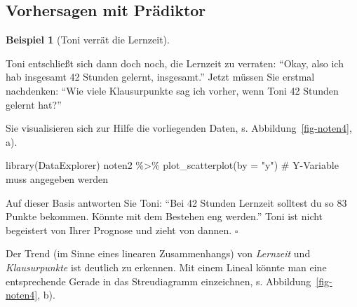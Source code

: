 \documentclass[
  letterpaper,
]{scrbook}
\newenvironment{Shaded}{\begin{snugshade}}{\end{snugshade}}
\newcommand{\AttributeTok}[1]{\textcolor[rgb]{0.40,0.45,0.13}{#1}}
\newcommand{\CommentTok}[1]{\textcolor[rgb]{0.37,0.37,0.37}{#1}}
\newcommand{\FunctionTok}[1]{\textcolor[rgb]{0.28,0.35,0.67}{#1}}
\newcommand{\NormalTok}[1]{\textcolor[rgb]{0.00,0.23,0.31}{#1}}
\newcommand{\SpecialCharTok}[1]{\textcolor[rgb]{0.37,0.37,0.37}{#1}}
\newcommand{\StringTok}[1]{\textcolor[rgb]{0.13,0.47,0.30}{#1}}
\theoremstyle{definition}
\theoremstyle{definition}
\newtheorem{example}{Beispiel}[chapter]
\theoremstyle{definition}
\theoremstyle{remark}
\begin{document}
\subsection{Vorhersagen mit
Prädiktor}\label{vorhersagen-mit-pruxe4diktor}

\begin{example}[Toni verrät die
Lernzeit]\protect\hypertarget{exm-noten3}{}\label{exm-noten3}

Toni entschließt sich dann doch noch, die Lernzeit zu verraten:
\enquote{Okay, also ich hab insgesamt 42 Stunden gelernt, insgesamt.}
Jetzt müssen Sie erstmal nachdenken: \enquote{Wie viele Klausurpunkte
sag ich vorher, wenn Toni 42 Stunden gelernt hat?}

Sie visualisieren sich zur Hilfe die vorliegenden Daten, s.
Abbildung~\ref{fig-noten4}, a).

\begin{Shaded}
\begin{Highlighting}[]
\FunctionTok{library}\NormalTok{(DataExplorer)}
\NormalTok{noten2 }\SpecialCharTok{\%\textgreater{}\%} 
  \FunctionTok{plot\_scatterplot}\NormalTok{(}\AttributeTok{by =} \StringTok{"y"}\NormalTok{)  }\CommentTok{\# Y{-}Variable muss angegeben werden}
\end{Highlighting}
\end{Shaded}

Auf dieser Basis antworten Sie Toni: \enquote{Bei 42 Stunden Lernzeit
solltest du so 83 Punkte bekommen. Könnte mit dem Bestehen eng werden.}
Toni ist nicht begeistert von Ihrer Prognose und zieht von dannen.
\(\square\)

\end{example}

Der Trend (im Sinne eines linearen Zusammenhangs) von \emph{Lernzeit}
und \emph{Klausurpunkte} ist deutlich zu erkennen. Mit einem Lineal
könnte man eine entsprechende Gerade in das Streudiagramm einzeichnen,
s. Abbildung~\ref{fig-noten4}, b).
\end{document}
